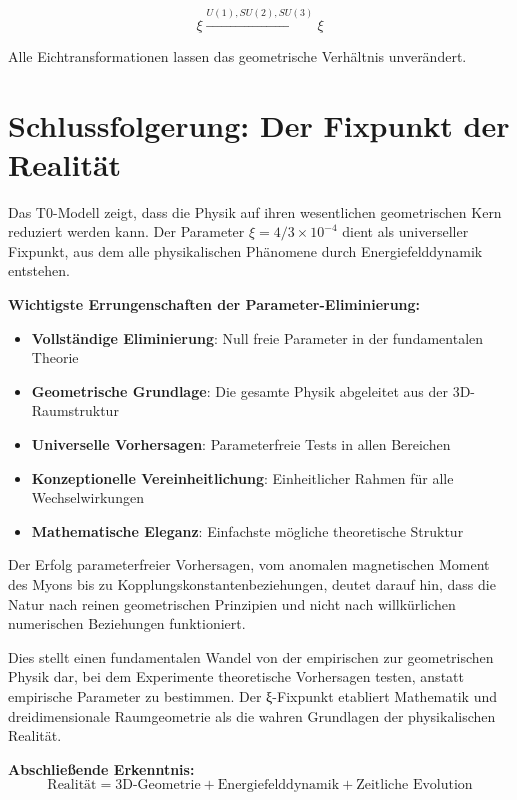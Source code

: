 \documentclass[12pt,a4paper]{report}
\begin{document}
	\begin{equation}
		\xi \xrightarrow{U(1), SU(2), SU(3)} \xi
	\end{equation}
	
	Alle Eichtransformationen lassen das geometrische Verhältnis unverändert.
	
	\section{Schlussfolgerung: Der Fixpunkt der Realität}
	\label{sec:conclusion_fixed_point}
	
	Das T0-Modell zeigt, dass die Physik auf ihren wesentlichen geometrischen Kern reduziert werden kann. Der Parameter $\xi = 4/3 \times 10^{-4}$ dient als universeller Fixpunkt, aus dem alle physikalischen Phänomene durch Energiefelddynamik entstehen.
	
	\textbf{Wichtigste Errungenschaften der Parameter-Eliminierung:}
	
	\begin{itemize}
		\item \textbf{Vollständige Eliminierung}: Null freie Parameter in der fundamentalen Theorie
		\item \textbf{Geometrische Grundlage}: Die gesamte Physik abgeleitet aus der 3D-Raumstruktur
		\item \textbf{Universelle Vorhersagen}: Parameterfreie Tests in allen Bereichen
		\item \textbf{Konzeptionelle Vereinheitlichung}: Einheitlicher Rahmen für alle Wechselwirkungen
		\item \textbf{Mathematische Eleganz}: Einfachste mögliche theoretische Struktur
	\end{itemize}
	
	Der Erfolg parameterfreier Vorhersagen, vom anomalen magnetischen Moment des Myons bis zu Kopplungskonstantenbeziehungen, deutet darauf hin, dass die Natur nach reinen geometrischen Prinzipien und nicht nach willkürlichen numerischen Beziehungen funktioniert.
	
	Dies stellt einen fundamentalen Wandel von der empirischen zur geometrischen Physik dar, bei dem Experimente theoretische Vorhersagen testen, anstatt empirische Parameter zu bestimmen. Der ξ-Fixpunkt etabliert Mathematik und dreidimensionale Raumgeometrie als die wahren Grundlagen der physikalischen Realität.
	
	\textbf{Abschließende Erkenntnis:}
	\begin{equation}
		\text{Realität} = \text{3D-Geometrie} + \text{Energiefelddynamik} + \text{Zeitliche Evolution}
	\end{equation}
	
\end{document}
